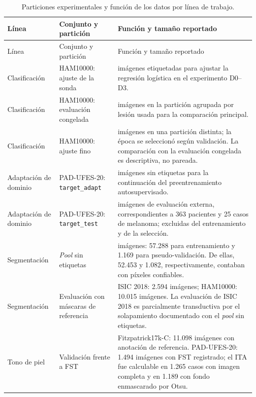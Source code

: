 \begingroup
\fontsize{11}{13}\selectfont
\singlespacing
\renewcommand{\arraystretch}{1.12}
\setlength{\tabcolsep}{4pt}
\begin{longtable}{@{}>{\raggedright\arraybackslash}p{}>{\raggedright\arraybackslash}p{}>{\raggedright\arraybackslash}p{}@{}}
\caption{Particiones experimentales y función de los datos por línea de trabajo.}\label{tab:particiones-experimentales}\\
\toprule
Línea & Conjunto y partición & Función y tamaño reportado \\
\midrule
\endfirsthead
\toprule
Línea & Conjunto y partición & Función y tamaño reportado \\
\midrule
\endhead
\bottomrule
\endfoot
Clasificación & HAM10000: ajuste de la sonda & 8.011 imágenes etiquetadas para ajustar la regresión logística en el experimento D0--D3. \\
\addlinespace
Clasificación & HAM10000: evaluación congelada & 2.004 imágenes en la partición agrupada por lesión usada para la comparación principal. \\
\addlinespace
Clasificación & HAM10000: ajuste fino & 2.014 imágenes en una partición distinta; la época se seleccionó según validación. La comparación con la evaluación congelada es descriptiva, no pareada. \\
\addlinespace
Adaptación de dominio & PAD-UFES-20: \texttt{target\_adapt} & 1.141 imágenes sin etiquetas para la continuación del preentrenamiento autosupervisado. \\
\addlinespace
Adaptación de dominio & PAD-UFES-20: \texttt{target\_test} & 567 imágenes de evaluación externa, correspondientes a 363 pacientes y 25 casos de melanoma; excluidas del entrenamiento y de la selección. \\
\addlinespace
Segmentación & \textit{Pool} sin etiquetas & 58.457 imágenes: 57.288 para entrenamiento y 1.169 para pseudo-validación. De ellas, 52.453 y 1.082, respectivamente, contaban con píxeles confiables. \\
\addlinespace
Segmentación & Evaluación con máscaras de referencia & ISIC 2018: 2.594 imágenes; HAM10000: 10.015 imágenes. La evaluación de ISIC 2018 es parcialmente transductiva por el solapamiento documentado con el \textit{pool} sin etiquetas. \\
\addlinespace
Tono de piel & Validación frente a FST & Fitzpatrick17k-C: 11.098 imágenes con anotación de referencia. PAD-UFES-20: 1.494 imágenes con FST registrado; el ITA fue calculable en 1.265 casos con imagen completa y en 1.189 con fondo enmascarado por Otsu. \\
\end{longtable}
